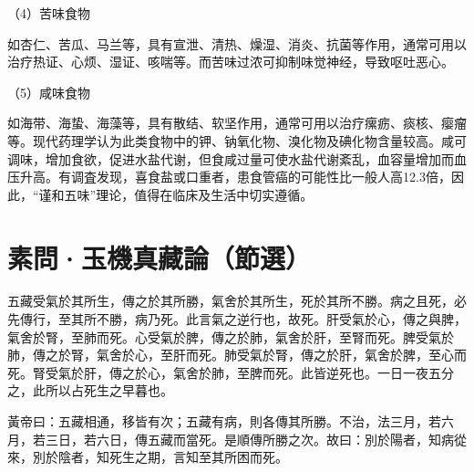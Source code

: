 \documentclass[draft,12pt]{ctexbook}
\begin{document}
（4）苦味食物

如杏仁、苦瓜、马兰等，具有宣泄、清热、燥湿、消炎、抗菌等作用，通常可用以治疗热证、心烦、湿证、咳喘等。而苦味过浓可抑制味觉神经，导致呕吐恶心。

（5）咸味食物

如海带、海蛰、海藻等，具有散结、软坚作用，通常可用以治疗瘰疬、痰核、瘿瘤等。现代药理学认为此类食物中的钾、钠氧化物、溴化物及碘化物含量较高。咸可调味，增加食欲，促进水盐代谢，但食咸过量可使水盐代谢紊乱，血容量增加而血压升高。有调査发现，喜食盐或口重者，患食管癌的可能性比一般人高12.3倍，因此，“谨和五味”理论，值得在临床及生活中切实遵循。

\section{素問·玉機真藏論（節選）}%


\begin{yuanwen}
五藏受氣於其所生，傳之於其所勝，氣舍於其所生，死於其所不勝。病之且死，必先傳行，至其所不勝，病乃死。此言氣之逆行也，故死。肝受氣於心，傳之與脾，氣舍於腎，至肺而死。心受氣於脾，傳之於肺，氣舍於肝，至腎而死。脾受氣於肺，傳之於腎，氣舍於心，至肝而死。肺受氣於腎，傳之於肝，氣舍於脾，至心而死。腎受氣於肝，傳之於心，氣舍於肺，至脾而死。此皆逆死也。一日一夜五分之，此所以占死生之早暮也。

黃帝曰：五藏相通，移皆有次；五藏有病，則各傳其所勝。不治，法三月，若六月，若三日，若六日，傳五藏而當死。是順傳所勝之次。故曰：別於陽者，知病從來，別於陰者，知死生之期，言知至其所困而死。
\end{yuanwen}

\end{document}
